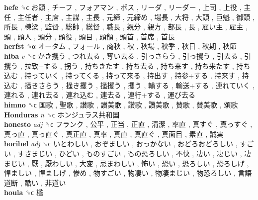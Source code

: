 \textbf{hefe} ␝ϲ   お頭 ,  チーフ ,  フォアマン ,  ボス ,  リーダ ,  リーダー ,  上司 ,  上役 ,  主任 ,  主任者 ,  主席 ,  主謀 ,  主長 ,  元締 ,  元締め ,  場長 ,  大将 ,  大頭 ,  巨魁 ,  御頭 ,  所長 ,  棟梁 ,  監督 ,  総帥 ,  総督 ,  職長 ,  親分 ,  親方 ,  部長 ,  長 ,  雇い主 ,  雇主 ,  頭 ,  頭人 ,  頭分 ,  頭役 ,  頭目 ,  頭領 ,  頭首 ,  首席 ,  首長   \\
\textbf{herfst} ␝α   オータム ,  フォール ,  商秋 ,  秋 ,  秋場 ,  秋季 ,  秋日 ,  秋期 ,  秋節   \\
\textbf{hiba} \emph{v}  ␝ϲ   かき攫う ,  つれ去る ,  奪い去る ,  引っさらう ,  引っ攫う ,  引去る ,  引攫う ,  拉致+する ,  拐う ,  持ちきたす ,  持ち去る ,  持ち来す ,  持ち来たす ,  持ち込む ,  持っていく ,  持ってくる ,  持って来る ,  持出す ,  持参+する ,  持来す ,  持込む ,  掻きさらう ,  掻き攫う ,  掻攫う ,  攫う ,  輸する ,  輸送+する ,  連れていく ,  連れる ,  連れ去る ,  連れ込む ,  連去る ,  連行+する ,  運び去る   \\
\textbf{himno} ␝ϲ   国歌 ,  聖歌 ,  讃歌 ,  讃美歌 ,  讚歌 ,  讚美歌 ,  賛歌 ,  賛美歌 ,  頌歌   \\
\textbf{Honduras} \emph{n}  ␝ϲ   ホンジュラス共和国   \\
\textbf{honesto} \emph{adj}  ␝ϲ   フランク ,  公平 ,  正当 ,  正直 ,  清潔 ,  率直 ,  真すぐ ,  真っすぐ ,  真っ直 ,  真っ直ぐ ,  真正直 ,  真率 ,  真直 ,  真直ぐ ,  真面目 ,  素直 ,  誠実   \\
\textbf{horibel} \emph{adj}  ␝ϲ   いとわしい ,  おぞましい ,  おっかない ,  おどろおどろしい ,  すごい ,  すさまじい ,  ひどい ,  ものすごい ,  もの恐ろしい ,  不快 ,  凄い ,  凄じい ,  凄まじい ,  厭 ,  厭わしい ,  大変 ,  忌まわしい ,  怖い ,  恐い ,  恐ろしい ,  恐ろしげ ,  悍ましい ,  悍ましげ ,  惨め ,  物すごい ,  物凄い ,  物凄まじい ,  物恐ろしい ,  言語道断 ,  酷い ,  非道い   \\
\textbf{houla} ␝ϲ   檻   \\
